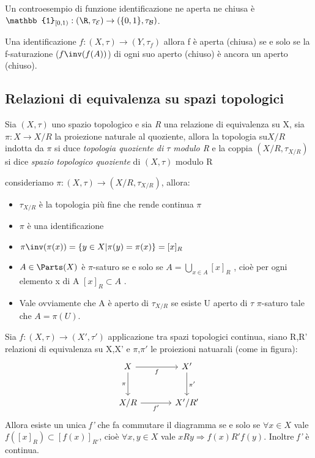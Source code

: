 \documentclass[a4paper]{article}
\begin{document}
\begin{ex}
		Un controesempio di funzione identificazione ne aperta ne chiusa è $\mathbb{1}_{[0,1)} : (\R,\tau_{\mathcal{E} })  \to (\{0,1\}, \tau_{\mathcal{B} }) $.
\end{ex}

\begin{lem}
	Una identificazione $f: (X,\tau ) \to (Y,\tau_f ) $ allora f è aperta (chiusa) se e solo se la f-saturazione ($f\inv(f(A))$) di ogni suo aperto (chiuso) è ancora un aperto (chiuso).
\end{lem}

\subsection{Relazioni di equivalenza su spazi topologici}
\begin{deff}
	Sia $(X,\tau)$ uno spazio topologico e sia \textit{R} una relazione di equivalenza su X, sia $\pi: X \to X/R$ la proiezione naturale al quoziente, allora la topologia su$X/R$ indotta da $\pi$ si duce \textit{topologia quoziente di $\tau$ modulo R} e la coppia $(X/R, \tau_{X/R})$ si dice \textit{spazio topologico quoziente} di $(X,\tau ) $ modulo R
\end{deff}

\begin{osss}
	consideriamo $\pi : (X,\tau) \to (X/R , \tau_{X/R})$, allora: 
	\begin{itemize}
		\item $\tau_{X/R}$ è la topologia più fine che rende continua $\pi$
		\item $\pi$ è una identificazione
		\item $\pi\inv (\pi (x)) = \{ y \in X | \pi(y) = \pi(x) \}= [x]_R $
		\item $A \in \Parts(X)$ è $\pi$-saturo se e solo se $A= \bigcup_{x \in A } [x]_R$ , cioè per ogni elemento x di A $[x]_R \subset A$ .
		\item Vale ovviamente che A è aperto di $\tau_{X/R}$ se esiste U aperto di $\tau$ $\pi$-saturo tale che $A=\pi (U)$.
	\end{itemize}
\end{osss}

\begin{lem}
	Sia $f : (X,\tau) \to (X',\tau')$ applicazione tra spazi topologici continua, siano R,R' relazioni di equivalenza su X,X' e $\pi$,$\pi'$ le proiezioni natuarali (come in figura):
	\[
	\begin{tikzcd}[column sep=large, row sep=large]
	X \ar[d, "\pi"'] \ar[r, "f"'] & X' \ar[d , "\pi'" ] \\
	X/R \ar[r, "f'"'] & X'/R'
	\end{tikzcd}
	\]
	Allora esiste un unica \textit{f'} che fa commutare il diagramma se e solo se $\forall x \in X$ vale $f([x]_R) \subset [f(x)]_{R'}$, cioè $\forall x,y \in X $ vale $xRy \Rightarrow f(x)R'f(y)$. Inoltre \textit{f'} è continua.
\end{lem}
\end{document}
